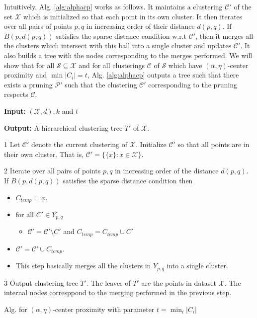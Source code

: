 \documentclass[11pt]{article}
\newcommand{\mc}{\mathcal}
\newenvironment{alg}{
    \begin{list}{}{
        \setlength{\itemsep}{2pt}
        \setlength{\parsep}{0pt}
        \setlength{\parskip}{0pt}
        \setlength{\topsep}{1pt}
    }
}
{
    \end{list}
}
\begin{document}
Intuitively, Alg. \ref{alg:alphacp} works as follows. It maintains a clustering $\mc C'$ of the set $\mc X$ which is initialized so that  each point in its own cluster. It then iterates over all pairs of points $p, q$ in increasing order of their distance $d(p, q)$. If $B(p, d(p,q))$ satisfies the sparse distance condition w.r.t $\mc C'$, then it merges all the clusters which intersect with this ball into a single cluster and updates $\mc C'$. It also builds a tree with the nodes corresponding to the merges performed. We will show that for all $\mc S \subseteq \mc X$ and for all clusterings $\mc C$ of $\mc S$ which have $(\alpha, \eta)$-center proximity and $\min |C_i| = t$, Alg. \ref{alg:alphacp} outputs a tree such that there exists a pruning $\mc P'$ such that the clustering $\mc C'$ corresponding to the pruning respects $\mc C$. %

\begin{algorithm}[!ht]
\begin{alg}
	\item \textbf{Input: } $(\mc X, d), k$ and $t$
	\item \textbf{Output: } A hierarchical clustering tree $T'$ of $\mc X$.
	\item[1] Let $\mc C'$ denote the current clustering of $\mc X$. Initialize $\mc C'$ so that all points are in their own cluster. That is, $\mc C' = \{ \{x\}: x \in \mc X\}$.
	\item[2] Iterate over all pairs of points $p, q$ in increasing order of the distance $d(p, q)$. If $B(p, d(p, q))$ satisfies the sparse distance condition then
	\begin{itemize}
	\renewcommand\labelitemi{}
		\item $C_{temp} = \phi$. 
		\item for all $C' \in Y_{p,q}$
		\begin{itemize}
		\renewcommand\labelitemii{}
			\item $\mc C' = \mc C' \setminus C'$ and $C_{temp} = C_{temp} \cup C'$
		\end{itemize}
		\item $\mc C' = \mc C' \cup C_{temp}$.
		\item This step basically merges all the clusters in $Y_{p, q}$ into a single cluster.
	\end{itemize}
	\item[3] Output clustering tree $T'$. The leaves of $T'$ are the points in dataset $\mc X$. The internal nodes corresppond to the merging performed in the previous step.
\end{alg}
\caption{Alg. for $(\alpha, \eta)$-center proximity with parameter $t = \min_i |C_i|$}
\label{alg:alphacp}
\end{algorithm}
\end{document}
